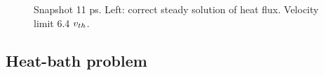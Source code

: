 \begin{figure}[tbh]
\begin{center}
\begin{tabular}{c}
    \end{tabular}
  \caption{  
  Snapshot 11 ps. Left: correct steady solution of heat flux. 
  Velocity limit 6.4 $v_{th}$.
  }
  \label{fig:C7_Calder_case1}
  \end{center} 
\end{figure}

\subsection{Heat-bath problem}  
\label{sec:heatbath_test}

